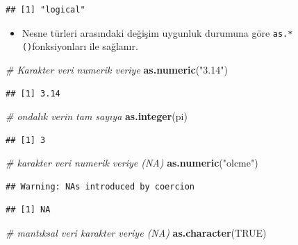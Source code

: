 \documentclass[
  oneside]{book}
\newenvironment{Shaded}{\begin{snugshade}}{\end{snugshade}}
\newcommand{\CommentTok}[1]{\textcolor[rgb]{0.56,0.35,0.01}{\textit{#1}}}
\newcommand{\ConstantTok}[1]{\textcolor[rgb]{0.56,0.35,0.01}{#1}}
\newcommand{\FunctionTok}[1]{\textcolor[rgb]{0.13,0.29,0.53}{\textbf{#1}}}
\newcommand{\NormalTok}[1]{#1}
\newcommand{\StringTok}[1]{\textcolor[rgb]{0.31,0.60,0.02}{#1}}
\providecommand{\tightlist}{%
  \setlength{\itemsep}{0pt}\setlength{\parskip}{0pt}}
\begin{document}
\begin{verbatim}
## [1] "logical"
\end{verbatim}

\begin{itemize}
\tightlist
\item
  Nesne türleri arasındaki değişim uygunluk durumuna göre \texttt{as.*()}fonksiyonları ile sağlanır.
\end{itemize}

\begin{Shaded}
\begin{Highlighting}[]
\CommentTok{\# Karakter veri numerik veriye}
\FunctionTok{as.numeric}\NormalTok{(}\StringTok{"3.14"}\NormalTok{)}
\end{Highlighting}
\end{Shaded}

\begin{verbatim}
## [1] 3.14
\end{verbatim}

\begin{Shaded}
\begin{Highlighting}[]
\CommentTok{\# ondalık verin tam sayıya}
\FunctionTok{as.integer}\NormalTok{(pi)}
\end{Highlighting}
\end{Shaded}

\begin{verbatim}
## [1] 3
\end{verbatim}

\begin{Shaded}
\begin{Highlighting}[]
\CommentTok{\# karakter veri numerik veriye (NA)}
\FunctionTok{as.numeric}\NormalTok{(}\StringTok{"olcme"}\NormalTok{)}
\end{Highlighting}
\end{Shaded}

\begin{verbatim}
## Warning: NAs introduced by coercion
\end{verbatim}

\begin{verbatim}
## [1] NA
\end{verbatim}

\begin{Shaded}
\begin{Highlighting}[]
\CommentTok{\# mantıksal veri karakter veriye (NA)}
\FunctionTok{as.character}\NormalTok{(}\ConstantTok{TRUE}\NormalTok{)}
\end{Highlighting}
\end{Shaded}
\end{document}
